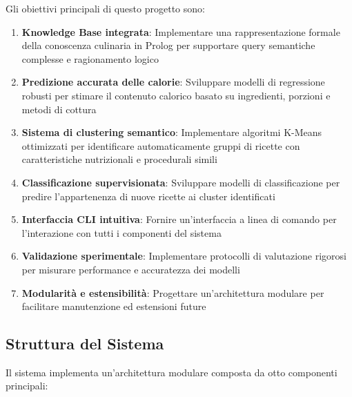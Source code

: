 \documentclass[12pt,a4paper]{article}
\begin{document}
Gli obiettivi principali di questo progetto sono:

\begin{enumerate}
    \item \textbf{Knowledge Base integrata}: Implementare una rappresentazione formale della conoscenza culinaria in Prolog per supportare query semantiche complesse e ragionamento logico
    
    \item \textbf{Predizione accurata delle calorie}: Sviluppare modelli di regressione robusti per stimare il contenuto calorico basato su ingredienti, porzioni e metodi di cottura
    
    \item \textbf{Sistema di clustering semantico}: Implementare algoritmi K-Means ottimizzati per identificare automaticamente gruppi di ricette con caratteristiche nutrizionali e procedurali simili
    
    \item \textbf{Classificazione supervisionata}: Sviluppare modelli di classificazione per predire l'appartenenza di nuove ricette ai cluster identificati
    
    \item \textbf{Interfaccia CLI intuitiva}: Fornire un'interfaccia a linea di comando per l'interazione con tutti i componenti del sistema
    
    \item \textbf{Validazione sperimentale}: Implementare protocolli di valutazione rigorosi per misurare performance e accuratezza dei modelli
    
    \item \textbf{Modularità e estensibilità}: Progettare un'architettura modulare per facilitare manutenzione ed estensioni future
\end{enumerate}

\subsection{Struttura del Sistema}

Il sistema implementa un'architettura modulare composta da otto componenti principali:
\end{document}
